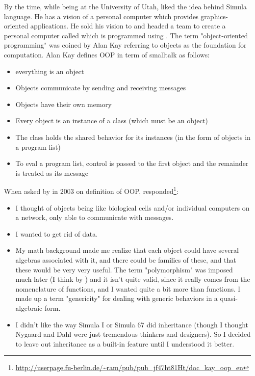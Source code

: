 \documentclass[12pt]{book}
\begin{document}
By the time, while being at the University of Utah,  liked the idea behind Simula language. 
He has a vision of a personal computer which provides graphics-oriented applications. 
He sold his vision to  and headed a team to create a personal computer called  which is programmed using .
The term "object-oriented programming" was coined by Alan Kay referring to objects as the foundation for computation.
Alan Kay defines OOP in term of smalltalk as follows: %
\begin{itemize}
	\item everything is an object
	\item Objects communicate by sending and receiving messages
	\item Objects have their own memory 
	\item Every object is an instance of a class (which must be an object)
	\item The class holds the shared behavior for its instances (in the form of objects in a program list)
	\item To eval a program list, control is passed to the first object and the remainder is treated as its message
\end{itemize}
When asked by  in 2003 on definition of OOP,  responded\footnote{\url{http://userpage.fu-berlin.de/~ram/pub/pub_jf47ht81Ht/doc_kay_oop_en}}:
\begin{itemize}
	\item I thought of objects being like biological cells and/or individual computers on a network, only able to communicate with messages.
	\item I wanted to get rid of data.
	\item My math background made me realize that each object could have several algebras associated with it, and there could be families of these, and that these would be very very useful. 
	The term "polymorphism" was imposed much later (I think by ) and it isn't quite valid, since it really comes from the nomenclature of functions, and I wanted quite a bit more than functions. 
	I made up a term "genericity" for dealing with generic behaviors in a quasi-algebraic form.
	\item I didn't like the way Simula I or Simula 67 did inheritance (though I thought Nygaard and Dahl were just tremendous thinkers and designers). So I decided to leave out inheritance as a built-in feature until I understood it better.
\end{itemize}
\end{document}
